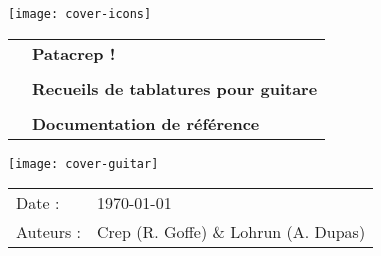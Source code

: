 \begin{titlepage}

  \texttt{[image: cover-icons]}
  \vspace{2cm}

  \begin{tabular}{l l}
    \hspace{2cm} & \textbf{\Huge Patacrep !}\\
    & \\
    & \textbf{\Large Recueils de tablatures pour guitare}\\
    & \\
    & \textbf{\large Documentation de référence}\\
  \end{tabular}

  \hspace{-2cm}\texttt{[image: cover-guitar]}

  \begin{flushright}
    \begin{tabular}{l l}
      Date : & \today \\
      Auteurs : &  Crep (R. Goffe) \& Lohrun (A. Dupas) \\
    \end{tabular}
  \end{flushright}

\end{titlepage}
